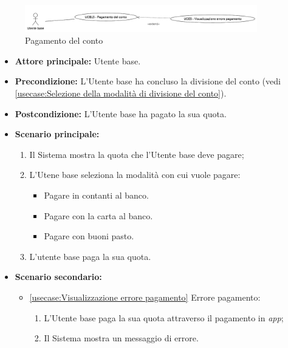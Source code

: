 \label{usecase:Pagamento del conto}

\begin{figure}[h]
	\centering
	\includegraphics[width=0.9\textwidth]{./uml/UCB15.png} 
	\caption{Pagamento del conto}
	\label{fig:UCB15}
  \end{figure}

\begin{itemize}
	\item \textbf{Attore principale:} Utente base.

	\item \textbf{Precondizione:} L'Utente base ha concluso la divisione del conto (vedi \autoref{usecase:Selezione della modalità di divisione del conto}).

	\item \textbf{Postcondizione:} L'Utente base ha pagato la sua quota.

	\item \textbf{Scenario principale:}
            \begin{enumerate}
                \item Il Sistema mostra la quota che l'Utente base deve pagare;
                \item L'Utene base seleziona la modalità con cui vuole pagare:
                \begin{itemize}
                    \item Pagare in contanti al banco.
                    \item Pagare con la carta al banco.
                    \item Pagare con buoni pasto.
                \end{itemize}
				\item L'utente base paga la sua quota.
	      \end{enumerate}

    \item \textbf{Scenario secondario:}
		  \begin{itemize}
			  \item \autoref{usecase:Visualizzazione errore pagamento} Errore pagamento:
				\begin{enumerate}
					\item L'Utente base paga la sua quota attraverso il pagamento in \textit{app};
					\item  Il Sistema mostra un messaggio di errore.
				\end{enumerate}
		  \end{itemize}
\end{itemize}